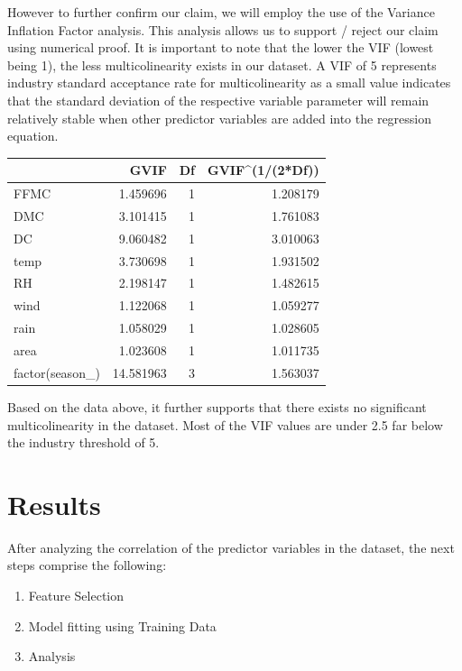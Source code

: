 \documentclass[conference,final,]{IEEEtran}
\begin{document}
However to further confirm our claim, we will employ the use of the
Variance Inflation Factor analysis. This analysis allows us to support /
reject our claim using numerical proof. It is important to note that the
lower the VIF (lowest being 1), the less multicolinearity exists in our
dataset. A VIF of 5 represents industry standard acceptance rate for
multicolinearity as a small value indicates that the standard deviation
of the respective variable parameter will remain relatively stable when
other predictor variables are added into the regression equation.

\begin{tabular}{l|r|r|r}
\hline
  & GVIF & Df & GVIF\textasciicircum{}(1/(2*Df))\\
\hline
FFMC & 1.459696 & 1 & 1.208179\\
\hline
DMC & 3.101415 & 1 & 1.761083\\
\hline
DC & 9.060482 & 1 & 3.010063\\
\hline
temp & 3.730698 & 1 & 1.931502\\
\hline
RH & 2.198147 & 1 & 1.482615\\
\hline
wind & 1.122068 & 1 & 1.059277\\
\hline
rain & 1.058029 & 1 & 1.028605\\
\hline
area & 1.023608 & 1 & 1.011735\\
\hline
factor(season\_) & 14.581963 & 3 & 1.563037\\
\hline
\end{tabular}

Based on the data above, it further supports that there exists no
significant multicolinearity in the dataset. Most of the VIF values are
under 2.5 far below the industry threshold of 5.

\hypertarget{results}{%
\section{Results}\label{results}}

After analyzing the correlation of the predictor variables in the
dataset, the next steps comprise the following:

\begin{enumerate}
\def\labelenumi{\arabic{enumi}.}
\item
  Feature Selection 
\item
  Model fitting using Training Data 
\item
  Analysis 
\end{enumerate}
\end{document}
